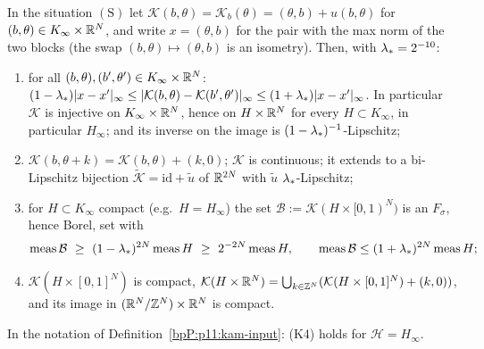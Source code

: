 \begin{theorem}\label{bpP:p11a:evaluation-bilipschitz}
In the situation $(\mathrm S)$ let $\mathcal K(b,\theta)=\mathcal K_b(\theta)=(\theta,b)+u(b,\theta)$ for $(b,\theta)\in K_\infty\times\mathbb{R}^N$, and write $x=(\theta,b)$ for the pair with the max norm of the two blocks (the swap $(b,\theta)\mapsto(\theta,b)$ is an isometry). Then, with $\lambda_{*}=2^{-10}$:
\begin{enumerate}[label=(\alph*)]
\item for all $(b,\theta),(b',\theta')\in K_\infty\times\mathbb{R}^N$: $(1-\lambda_{*})\lvert x-x'\rvert_\infty\le\lvert\mathcal K(b,\theta)-\mathcal K(b',\theta')\rvert_\infty\le(1+\lambda_{*})\lvert x-x'\rvert_\infty$. In particular $\mathcal K$ is injective on $K_\infty\times\mathbb{R}^N$, hence on $H\times\mathbb{R}^N$ for every $H\subset K_\infty$, in particular $H_\infty$; and its inverse on the image is $(1-\lambda_{*})^{-1}$-Lipschitz;
\item $\mathcal K(b,\theta+k)=\mathcal K(b,\theta)+(k,0)$; $\mathcal K$ is continuous; it extends to a bi-Lipschitz bijection $\widetilde{\mathcal K}=\mathrm{id}+\widetilde u$ of $\mathbb{R}^{2N}$ with $\widetilde u$ $\lambda_{*}$-Lipschitz;
\item for $H\subset K_\infty$ compact (e.g.\ $H=H_\infty$) the set $\mathcal B:=\mathcal K(H\times[0,1)^N)$ is an $F_\sigma$, hence Borel, set with
\[\operatorname{meas}\mathcal B\ \ge\ (1-\lamstar)^{2N}\operatorname{meas}H\ \ge\ 2^{-2N}\operatorname{meas}H,\qquad\operatorname{meas}\mathcal B\le(1+\lamstar)^{2N}\operatorname{meas}H;\]
\item $\mathcal K(H\times[0,1]^N)$ is compact, $\mathcal K(H\times\mathbb{R}^N)=\bigcup_{k\in\mathbb{Z}^N}(\mathcal K(H\times[0,1]^N)+(k,0))$, and its image in $(\mathbb{R}^N/\mathbb{Z}^N)\times\mathbb{R}^N$ is compact.
\end{enumerate}
In the notation of Definition~\ref{bpP:p11:kam-input}: (K4) holds for $\mathcal H=H_\infty$.
\end{theorem}
